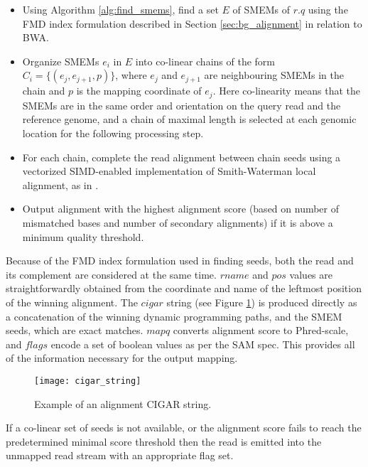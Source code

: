 \begin{itemize}
    \item Using Algorithm \ref{alg:find_smems}, find a set $E$ of SMEMs of $r.q$\autocite{li2013aligning} using the FMD index formulation described in Section \ref{sec:bg_alignment} in relation to BWA. 
    \item Organize SMEMs $e_i$ in $E$ into co-linear chains of the form $C_i = \{(e_j,e_{j+1},p)\}$, where $e_j$ and $e_{j+1}$ are neighbouring SMEMs in the chain and $p$ is the mapping coordinate of $e_j$. Here co-linearity means that the SMEMs are in the same order and orientation on the query read and the reference genome, and a chain of maximal length is selected at each genomic location for the following processing step.
    \item For each chain, complete the read alignment between chain seeds using a vectorized SIMD-enabled implementation of Smith-Waterman local alignment, as in \autocite{farrar2006striped}.
    \item Output alignment with the highest alignment score (based on number of mismatched bases and number of secondary alignments) if it is above a minimum quality threshold. 
\end{itemize}

Because of the FMD index formulation used in finding seeds, both the read and its complement are considered at the same time. $rname$ and $pos$ values are straightforwardly obtained from the coordinate and name of the leftmost position of the winning alignment. The $cigar$ string (see Figure \ref{fig:main_body_cigar_string}) is produced directly as a concatenation of the winning dynamic programming paths, and the SMEM seeds, which are exact matches. $mapq$ converts alignment score to Phred-scale, and $flags$ encode a set of boolean values as per the SAM spec. This provides all of the information necessary for the output mapping.

\begin{figure}[H]
    \texttt{[image: cigar\_string]}
    \centering
    \caption {Example of an alignment CIGAR string.}
    \label{fig:main_body_cigar_string}
\end{figure}

If a co-linear set of seeds is not available, or the alignment score fails to reach the predetermined minimal score threshold then the read is emitted into the unmapped read stream with an appropriate flag set.

